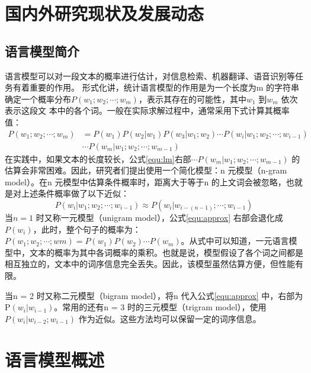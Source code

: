 \documentclass[12pt,a4paper]{article}
\begin{document}
\section{国内外研究现状及发展动态}
\subsection{语言模型简介}
语言模型可以对一段文本的概率进行估计，对信息检索\cite{Jin:2002:TLM:564376.564386}、机器翻译\cite{DBLP:conf/naacl/BaltescuB15}、语音识别等任务有着重要的作用。
形式化讲，统计语言模型的作用是为一个长度为m 的字符串确定一个概率分布$P(w_1;w_2;\cdots;w_m)$，表示其存在的可能性，其中$w_1$ 到$w_m$ 依次表示这段文
本中的各个词。一般在实际求解过程中，通常采用下式计算其概率值：
\begin{equation}
\label{equ:lm}
\begin{split}
P(w_1;w_2; \cdots;w_m) &= P(w_1) P(w_2|w_1) P(w_3|w_1;w_2)\cdots P(w_i | w_1;w_2;\cdots;w_{i-1}) \\
&\cdots P(w_m | w_1;w_2;\cdots;w_{m-1})
\end{split}
\end{equation}
在实践中，如果文本的长度较长，公式\ref{equ:lm}右部$\cdots P(w_m | w_1;w_2;\cdots;w_{m-1}) $ 的估算会非常困难。因此，研究者们提出使用一个简化模型：n 元模型（n-gram model）。在n 元模型中估算条件概率时，距离大于等于n 的上文词会被忽略，也就是对上述条件概率做了以下近似：
\begin{equation}
\label{equ:approx}
P(w_i | w_1;w_2;\cdots;w_{i-1})  \approx P(w_i | w_{i-(n-1)};\cdots;w_{i-1})
\end{equation}
当$n = 1$ 时又称一元模型（unigram model），公式\ref{equ:approx} 右部会退化成$P(w_i)$，此时，整个句子的概率为：$P(w_1;w_2; \cdots;wm) = P(w_1)P(w_2) \cdots P(w_m)$。从式中可以知道，一元语言模型中，文本的概率为其中各词概率的乘积。也就是说，模型假设了各个词之间都是相互独立的，文本中的词序信息完全丢失。因此，该模型虽然估算方便，但性能有限。

当n = 2 时又称二元模型（bigram model），将n 代入公式\ref{equ:approx} 中，右部为P$(w_i|w_{i-1})$。常用的还有n = 3 时的三元模型（trigram model），使用$P(w_i |w_{i-2};w_{i-1})$ 作为近似。这些方法均可以保留一定的词序信息。



\section{语言模型概述}
\end{document}
